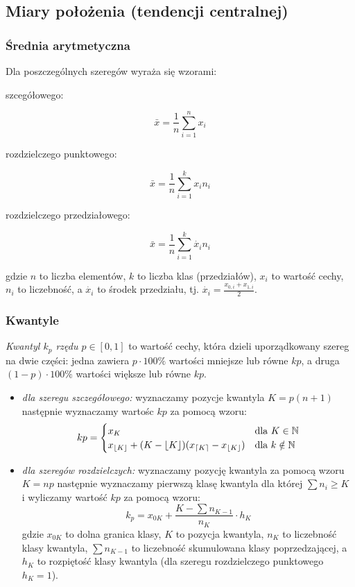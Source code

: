 \documentclass[../Matematyka.tex]{subfiles}
\begin{document}
\newpage
\subsection{Miary położenia (tendencji centralnej)}
\subsubsection*{Średnia arytmetyczna}
Dla poszczególnych szeregów wyraża się wzorami:
\begin{multicols}{3}
    \begin{center}szcegółowego:\end{center}
    \[\bar{x} = \frac{1}{n} \sum_{i=1}^{n}x_i\]
    \begin{center}rozdzielczego punktowego:\end{center}
    \[\bar{x} = \frac{1}{n} \sum_{i=1}^{k}x_in_i\]
    \begin{center}rozdzielczego przedziałowego:\end{center}
    \[\bar{x} = \frac{1}{n} \sum_{i=1}^{k}\dot{x_i}n_i\]
\end{multicols}
gdzie \(n\) to liczba elementów, \(k\) to liczba klas (przedziałów), \(x_i\) to wartość cechy, \(n_i\) to liczebność, a \(\dot{x_i}\) to środek przedziału, tj. \(\dot{x_i} = \frac{x_{0,i} + x_{1,i}}{2}\).
\subsubsection*{Kwantyle}
{\it Kwantyl \(k_p\) rzędu \(p \in [0,1]\)} to wartość cechy, która dzieli uporządkowany szereg na dwie części: jedna zawiera \(p\cdot100\%\) wartości mniejsze lub równe \(kp\), a druga \((1-p)\cdot100\%\) wartości większe lub równe \(kp\).
\begin{itemize}
    \item {\it dla szeregu szczegółowego:} wyznaczamy pozycje kwantyla \(K = p(n+1)\) następnie wyznaczamy wartośc \(kp\) za pomocą wzoru:
          \[kp =
              \begin{cases}
                  x_K                                                                                          & \text{dla } K \in \mathbb{N}    \\
                  x_{\lfloor K \rfloor} + (K - \lfloor K \rfloor)(x_{\lceil K \rceil} - x_{\lfloor K \rfloor}) & \text{dla } k \notin \mathbb{N}
              \end{cases}\]
    \item {\it dla szeregów rozdzielczych:} wyznaczamy pozycję kwantyla za pomocą wzoru \(K = np\) następnie wyznaczamy pierwszą klasę kwantyla dla której \(\sum n_i \geq K\) i wyliczamy wartość \(kp\) za pomocą wzoru:
          \[k_p=x_{0K} + \frac{K - \sum n_{K-1}}{n_K}\cdot h_K\]
          gdzie \(x_{0K}\) to dolna granica klasy, \(K\) to pozycja kwantyla, \(n_K\) to liczebność klasy kwantyla, \(\sum n_{K-1}\) to liczebność skumulowana klasy poprzedzającej, a \(h_K\) to rozpiętość klasy kwantyla (dla szeregu rozdzielczego punktowego \(h_K = 1\)).
\end{itemize}
\end{document}
